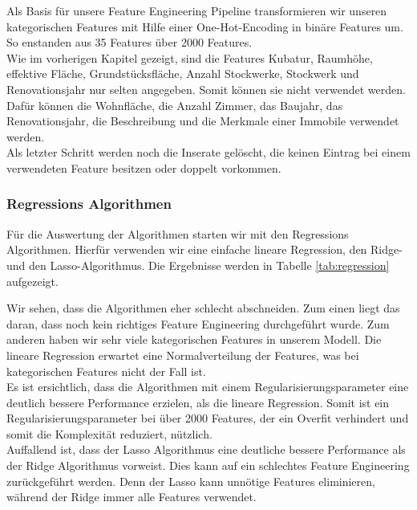Als Basis für unsere Feature Engineering Pipeline transformieren wir unseren kategorischen Features mit Hilfe einer One-Hot-Encoding in binäre Features um. So enstanden aus 35 Features über 2000 Features.\\
Wie im vorherigen Kapitel gezeigt, sind die Features Kubatur, Raumhöhe, effektive Fläche, Grundstücksfläche, Anzahl Stockwerke, Stockwerk und Renovationsjahr nur selten angegeben. Somit können sie nicht verwendet werden. Dafür können die Wohnfläche, die Anzahl Zimmer, das Baujahr, das Renovationsjahr, die Beschreibung und die Merkmale einer Immobile verwendet werden.\\
Als letzter Schritt werden noch die Inserate gelöscht, die keinen Eintrag bei einem verwendeten Feature besitzen oder doppelt vorkommen.

\subsubsection{Regressions Algorithmen}
Für die Auswertung der Algorithmen starten wir mit den Regressions Algorithmen. Hierfür verwenden wir eine  einfache lineare Regression, den Ridge- und den Lasso-Algorithmus. Die Ergebnisse werden in Tabelle \ref{tab:regression} aufgezeigt.

\begin{table}[h]
\centering
{}
\caption{Ergebnisse der Regression Algorithmen}
\label{tab:regression}
\end{table}

Wir sehen, dass die Algorithmen eher schlecht abschneiden. Zum einen liegt das daran, dass noch kein richtiges Feature Engineering durchgeführt wurde. Zum anderen haben wir sehr viele kategorischen Features in unserem Modell. Die lineare Regression erwartet eine Normalverteilung der Features, was bei kategorischen Features nicht der Fall ist.\\
Es ist ersichtlich, dass die Algorithmen mit einem Regularisierungsparameter eine deutlich bessere Performance erzielen, als die lineare Regression. Somit ist ein Regularisierungsparameter bei über 2000 Features, der ein Overfit verhindert und somit die Komplexität reduziert, nützlich.\\
Auffallend ist, dass der Lasso Algorithmus eine deutliche bessere Performance als der Ridge Algorithmus vorweist. Dies kann auf ein schlechtes Feature Engineering zurückgeführt werden. Denn der Lasso kann unnötige Features eliminieren, während der Ridge immer alle Features verwendet.

